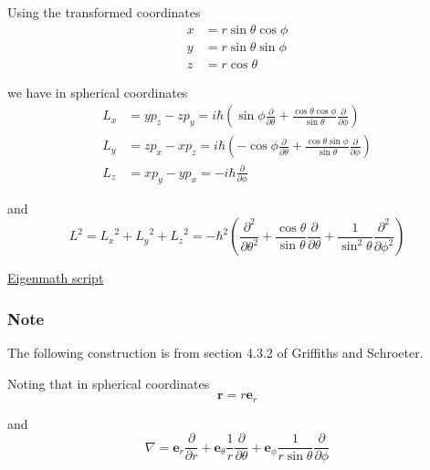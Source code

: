 Using the transformed coordinates
\begin{align*}
%
%
x&=r\sin\theta\cos\phi
\\
y&=r\sin\theta\sin\phi
\\
z&=r\cos\theta
\end{align*}

we have in spherical coordinates
\begin{align*}
%
%
L_x&=yp_z-zp_y=i\hbar\left(\sin\phi\frac{\partial}{\partial\theta}
+\frac{\cos\theta\cos\phi}{\sin\theta}\frac{\partial}{\partial\phi}\right)
\\[1ex]
%
%
L_y&=zp_x-xp_z=i\hbar\left(-\cos\phi\frac{\partial}{\partial\theta}
+\frac{\cos\theta\sin\phi}{\sin\theta}\frac{\partial}{\partial\phi}\right)
\\[1ex]
%
%
L_z&=xp_y-yp_x=-i\hbar\frac{\partial}{\partial\phi}
\end{align*}

and
\begin{equation*}
%
%
L^2={L_x}^2+{L_y}^2+{L_z}^2=-\hbar^2\left(
\frac{\partial^2}{\partial\theta^2}
+\frac{\cos\theta}{\sin\theta}\frac{\partial}{\partial\theta}
+\frac{1}{\sin^2\theta}\frac{\partial^2}{\partial\phi^2}
\right)
\end{equation*}

\href{https://georgeweigt.github.io/examples/angular-momentum-3-demo.html}{Eigenmath script}

\subsubsection*{Note}

The following construction is from section 4.3.2 of Griffiths and Schroeter.

\bigskip
Noting that in spherical coordinates
\begin{equation*}
\mathbf r=r\mathbf e_r
\end{equation*}

and
\begin{equation*}
\nabla=\mathbf e_r\frac{\partial}{\partial r}
+\mathbf e_\theta\frac{1}{r}\frac{\partial}{\partial\theta}
+\mathbf e_\phi\frac{1}{r\sin\theta}\frac{\partial}{\partial\phi}
\end{equation*}


